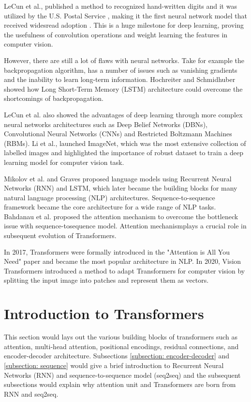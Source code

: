 LeCun et al., published a method to recognized hand-written digits and it was utilized by the U.S. Postal Service \cite{LeCunBoserDenkerEtAl89}, making it the first neural network model that received widesread adoption . This is a huge milestone for deep learning, proving the usefulness of convolution operations and weight learning the features in computer vision.

However, there are still a lot of flaws with neural networks. Take for example the backpropagation algorithm, has a number of issues such as vanishing gradients and the inability to learn long-term information. Hochreiter and Schmidhuber showed how  Long Short-Term Memory (LSTM) architecture could overcome the shortcomings of backpropagation.

LeCun et al. also showed the advantages of deep learning through more complex neural networks architectures such as  Deep Belief Networks (DBNs), Convolutional Neural Networks (CNNs) and Restricted Boltzmann Machines (RBMs). Li et al.,  launched ImageNet, which was the most extensive collection of labelled images and highlighted the importance of robust dataset to train a deep learning model for computer vision task. 

Mikolov et al. and Graves proposed language models using Recurrent Neural Networks (RNN) and LSTM, which later became the building blocks for many natural language processing (NLP) architectures. Sequence-to-sequence framework became the core architecture for a wide range of NLP tasks. Bahdanau et al. proposed the attention mechanism to overcome the bottleneck issue with sequence-tosequence model. Attention mechanismplays a crucial role in subsequent evolution of Transformers.

In 2017, Transformers were formally introduced in the "Attention is All You Need" paper \cite{attention-is-all-you-need} and became the most popular architecture in NLP. In 2020, Vision Transformers \cite{16x16} introduced a method to adapt Transformers for computer vision by splitting the input image into patches and represent them as vectors.

\section{Introduction to Transformers}
This section would  lays out the various building blocks of transformers such as attention, multi-head attention, positional encodings, residual connections, and encoder-decoder architecture. Subsections \ref{subsection: encoder-decoder} and \ref{subsection: sequence} would give a brief introduction to Recurrent Neural Networks (RNN) and sequence-to-sequence model (seq2seq) and the subsequent subsections would explain why attention unit and Transformers are born from RNN and seq2seq. 
